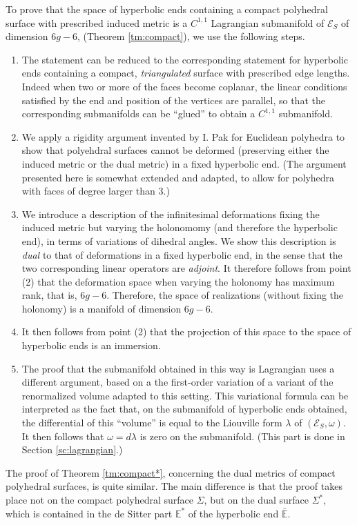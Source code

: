 \documentclass[notitlepage,twoside,a4paper]{amsart}
\theoremstyle{named}
\newcommand{\bE}{{\mathbb E}}
\newcommand{\cE}{{\mathcal E}}
\begin{document}
To prove that the space of hyperbolic ends containing a compact polyhedral surface with prescribed induced metric is a $C^{1,1}$ Lagrangian submanifold of $\cE_S$ of dimension $6g-6$, (Theorem \ref{tm:compact}), we use the following steps.
\begin{enumerate}
\item The statement can be reduced to the corresponding statement for hyperbolic ends containing a compact, {\em triangulated} surface with prescribed edge lengths. Indeed when two or more of the faces become coplanar, the linear conditions satisfied by the end and position of the vertices are parallel, so that the corresponding submanifolds can be ``glued'' to obtain a $C^{1,1}$ submanifold.
\item We apply a rigidity argument invented by I. Pak \cite{pak:short} for Euclidean polyhedra to show that polyehdral surfaces cannot be deformed (preserving either the induced metric or the dual metric) in a fixed hyperbolic end. (The argument presented here is somewhat extended and adapted, to allow for polyhedra with faces of degree larger than $3$.)
\item We introduce a description of the infinitesimal deformations fixing the induced metric but varying the holonomomy (and therefore the hyperbolic end), in terms of variations of dihedral angles. We show this description is {\em dual} to that of deformations in a fixed hyperbolic end, in the sense that the two corresponding linear operators are {\em adjoint}. It therefore follows from point (2) that the deformation space when varying the holonomy has maximum rank, that is, $6g-6$. Therefore, the space of realizations (without fixing the holonomy) is a manifold of dimension $6g-6$.
\item It then follows from point (2) that the projection of this space to the space of hyperbolic ends is an immersion.
\item The proof that the submanifold obtained in this way is Lagrangian uses a different argument, based on a the first-order variation of a variant of the renormalized volume adapted to this setting. This variational formula can be interpreted as the fact that, on the submanifold of hyperbolic ends obtained, the differential of this ``volume'' is equal to the Liouville form $\lambda$ of $(\cE_S,\omega)$. It then follows that $\omega=d\lambda$ is zero on the submanifold. (This part is done in Section \ref{sc:lagrangian}.) 
\end{enumerate}

The proof of Theorem \ref{tm:compact*}, concerning the dual metrics of compact polyhedral surfaces, is quite similar. The main difference is that the proof takes place not on the compact polyhedral surface $\Sigma$, but on the dual surface $\Sigma^*$, which is contained in the de Sitter part $\bE^*$ of the hyperbolic end $\bar \bE$.
\end{document}
